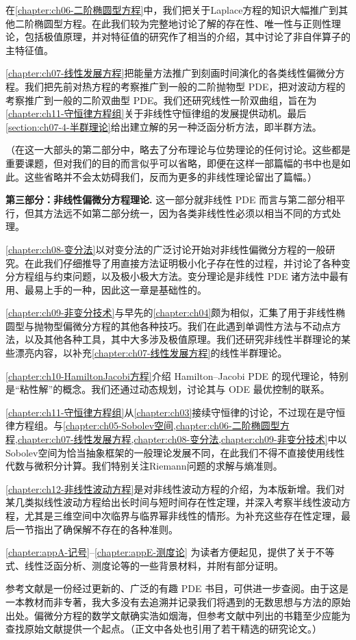 \documentclass[../../main.tex]{subfiles}
\begin{document}
在\cref{chapter:ch06-二阶椭圆型方程}中，我们把关于Laplace方程的知识大幅推广到其他二阶椭圆型方程。在此我们较为完整地讨论了解的存在性、唯一性与正则性理论，包括极值原理，并对特征值的研究作了相当的介绍，其中讨论了非自伴算子的主特征值。

\cref{chapter:ch07-线性发展方程}把能量方法推广到刻画时间演化的各类线性偏微分方程。我们把先前对热方程的考察推广到一般的二阶抛物型 PDE，把对波动方程的考察推广到一般的二阶双曲型 PDE。我们还研究线性一阶双曲组，旨在为\cref{chapter:ch11-守恒律方程组}关于非线性守恒律组的发展提供动机。最后\cref{section:ch07-4-半群理论}给出建立解的另一种泛函分析方法，即半群方法。

（在这一大部头的第二部分中，略去了分布理论与位势理论的任何讨论。这些都是重要课题，但对我们的目的而言似乎可以省略，即便在这样一部篇幅的书中也是如此。这些省略并不会太妨碍我们，反而为更多的非线性理论留出了篇幅。）

\textbf{第三部分：非线性偏微分方程理论.} 这一部分就非线性 PDE 而言与第二部分相平行，但其方法远不如第二部分统一，因为各类非线性性必须以相当不同的方式处理。

\cref{chapter:ch08-变分法}以对变分法的广泛讨论开始对非线性偏微分方程的一般研究。在此我们仔细推导了用直接方法证明极小化子存在性的过程，并讨论了各种变分方程组与约束问题，以及极小极大方法。变分理论是非线性 PDE 诸方法中最有用、最易上手的一种，因此这一章是基础性的。

\cref{chapter:ch09-非变分技术}与早先的\cref{chapter:ch04}颇为相似，汇集了用于非线性椭圆型与抛物型偏微分方程的其他各种技巧。我们在此遇到单调性方法与不动点方法，以及其他各种工具，其中大多涉及极值原理。我们还研究非线性半群理论的某些漂亮内容，以补充\cref{chapter:ch07-线性发展方程}的线性半群理论。

\cref{chapter:ch10-HamiltonJacobi方程}介绍 Hamilton--Jacobi PDE 的现代理论，特别是``粘性解''的概念。我们还通过动态规划，讨论其与 ODE 最优控制的联系。

\cref{chapter:ch11-守恒律方程组}从\cref{chapter:ch03}接续守恒律的讨论，不过现在是守恒律方程组。与\cref{chapter:ch05-Sobolev空间,chapter:ch06-二阶椭圆型方程,chapter:ch07-线性发展方程,chapter:ch08-变分法,chapter:ch09-非变分技术}中以Sobolev空间为恰当抽象框架的一般理论发展不同，在此我们不得不直接使用线性代数与微积分计算。我们特别关注Riemann问题的求解与熵准则。

\cref{chapter:ch12-非线性波动方程}是对非线性波动方程的介绍，为本版新增。我们对某几类拟线性波动方程给出长时间与短时间存在性定理，并深入考察半线性波动方程，尤其是三维空间中次临界与临界幂非线性的情形。为补充这些存在性定理，最后一节指出了确保解不存在的各种准则。

\cref{chapter:appA-记号}--\cref{chapter:appE-测度论} 为读者方便起见，提供了关于不等式、线性泛函分析、测度论等的一些背景材料，并附有部分证明。

参考文献是一份经过更新的、广泛的有趣 PDE 书目，可供进一步查阅。由于这是一本教材而非专著，我大多没有去追溯并记录我们将遇到的无数思想与方法的原始出处。偏微分方程的数学文献确实浩如烟海，但参考文献中列出的书籍至少应能为查找原始文献提供一个起点。（正文中各处也引用了若干精选的研究论文。）
\end{document}
